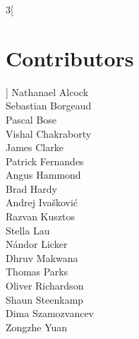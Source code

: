 \thispagestyle{plain}
\begin{multicols}{3}[\section*{Contributors}]
Nathanael Alcock\\
Sebastian Borgeaud\\
Pascal Bose\\
Vishal Chakraborty\\
James Clarke\\
Patrick Fernandes\\
Angus Hammond\\
Brad Hardy\\
Andrej Ivašković\\
Razvan Kusztos\\
Stella Lau\\
Nándor Licker\\
Dhruv Makwana\\
Thomas Parks\\
Oliver Richardson\\
Shaun Steenkamp\\
Dima Szamozvancev\\
Zongzhe Yuan
\end{multicols}
\clearpage


\tableofcontents

\newpage



















